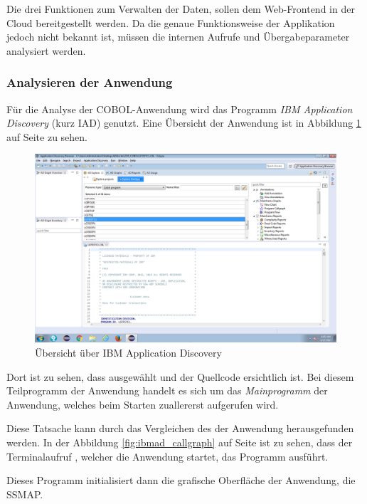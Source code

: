Die drei Funktionen zum Verwalten der Daten, sollen dem Web-Frontend in der Cloud bereitgestellt werden. Da die genaue
Funktionsweise der Applikation jedoch nicht bekannt ist, müssen die internen Aufrufe und Übergabeparameter analysiert
werden.

\subsubsection{Analysieren der Anwendung}
Für die Analyse der COBOL-Anwendung wird das Programm \textit{IBM Application Discovery} (kurz IAD) genutzt. Eine
Übersicht der Anwendung ist in Abbildung \ref{fig:ibmad_uebersicht} auf Seite \pageref{fig:ibmad_uebersicht} zu sehen.

\begin{figure}[h]
  \centering
    \includegraphics[scale=0.27]{images/kapitel_4/ibmad_uebersicht.png}
  \caption{Übersicht über IBM Application Discovery}
  \label{fig:ibmad_uebersicht}
\end{figure}

Dort ist zu sehen, dass  ausgewählt und der Quellcode ersichtlich ist. Bei diesem Teilprogramm der
Anwendung handelt es sich um das \textit{Mainprogramm} der Anwendung, welches beim Starten zuallererst aufgerufen wird.

Diese Tatsache kann durch das Vergleichen des  der Anwendung herausgefunden werden. In der Abbildung
\ref{fig:ibmad_callgraph} auf Seite \pageref{fig:ibmad_callgraph} ist zu sehen, dass der Terminalaufruf , welcher
die Anwendung startet, das Programm  ausführt.

Dieses Programm initialisiert dann die grafische Oberfläche der Anwendung, die SSMAP.

